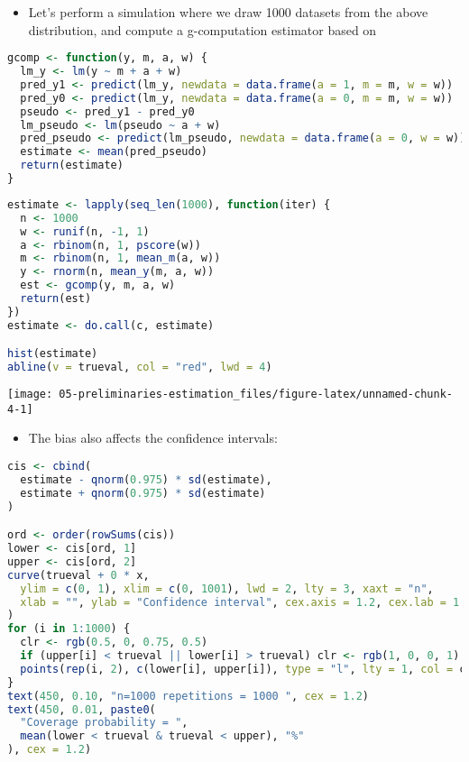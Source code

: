 \documentclass[
  12pt,
]{book}
\providecommand{\tightlist}{%
  \setlength{\itemsep}{0pt}\setlength{\parskip}{0pt}}
\theoremstyle{definition}
\theoremstyle{definition}
\theoremstyle{definition}
\newcommand{\1}{\mathbbm{1}}
\begin{document}
\begin{itemize}
\tightlist
\item
  Let's perform a simulation where we draw 1000 datasets from the above
  distribution, and compute a g-computation estimator based on
\end{itemize}

\begin{lstlisting}[language=R]
gcomp <- function(y, m, a, w) {
  lm_y <- lm(y ~ m + a + w)
  pred_y1 <- predict(lm_y, newdata = data.frame(a = 1, m = m, w = w))
  pred_y0 <- predict(lm_y, newdata = data.frame(a = 0, m = m, w = w))
  pseudo <- pred_y1 - pred_y0
  lm_pseudo <- lm(pseudo ~ a + w)
  pred_pseudo <- predict(lm_pseudo, newdata = data.frame(a = 0, w = w))
  estimate <- mean(pred_pseudo)
  return(estimate)
}
\end{lstlisting}

\begin{lstlisting}[language=R]
estimate <- lapply(seq_len(1000), function(iter) {
  n <- 1000
  w <- runif(n, -1, 1)
  a <- rbinom(n, 1, pscore(w))
  m <- rbinom(n, 1, mean_m(a, w))
  y <- rnorm(n, mean_y(m, a, w))
  est <- gcomp(y, m, a, w)
  return(est)
})
estimate <- do.call(c, estimate)

hist(estimate)
abline(v = trueval, col = "red", lwd = 4)
\end{lstlisting}

\begin{center}\texttt{[image: 05-preliminaries-estimation\_files/figure-latex/unnamed-chunk-4-1]} \end{center}

\begin{itemize}
\tightlist
\item
  The bias also affects the confidence intervals:
\end{itemize}

\begin{lstlisting}[language=R]
cis <- cbind(
  estimate - qnorm(0.975) * sd(estimate),
  estimate + qnorm(0.975) * sd(estimate)
)

ord <- order(rowSums(cis))
lower <- cis[ord, 1]
upper <- cis[ord, 2]
curve(trueval + 0 * x,
  ylim = c(0, 1), xlim = c(0, 1001), lwd = 2, lty = 3, xaxt = "n",
  xlab = "", ylab = "Confidence interval", cex.axis = 1.2, cex.lab = 1.2
)
for (i in 1:1000) {
  clr <- rgb(0.5, 0, 0.75, 0.5)
  if (upper[i] < trueval || lower[i] > trueval) clr <- rgb(1, 0, 0, 1)
  points(rep(i, 2), c(lower[i], upper[i]), type = "l", lty = 1, col = clr)
}
text(450, 0.10, "n=1000 repetitions = 1000 ", cex = 1.2)
text(450, 0.01, paste0(
  "Coverage probability = ",
  mean(lower < trueval & trueval < upper), "%"
), cex = 1.2)
\end{lstlisting}
\end{document}
